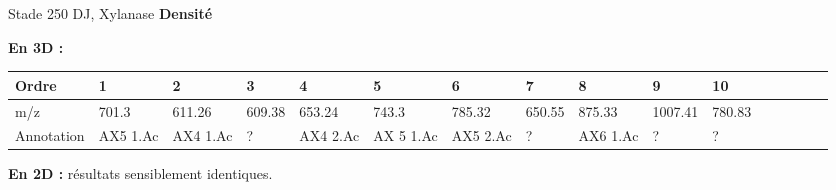 \documentclass[10pt]{beamer}
\begin{document}
\begin{frame}{Stade 250 DJ, Xylanase}
  \textbf{Densité}
  
  \textbf{En 3D :}
    \vspace{-0.4cm}

    \begin{table}[]
    \centering
    \begin{adjustbox}{max width=1\textwidth}
      \begin{tabular}{llllllllllllllll}
        \toprule
        Ordre & 1       & 2       & 3       & 4       & 5       & 6       & 7       & 8       & 9       & 10       \\
        \midrule
        m/z & 701.3 & 611.26 & 609.38 & 653.24 & 743.3 & 785.32 & 650.55 & 875.33 & 1007.41 & 780.83 \\
        Annotation & AX5 1.Ac & AX4 1.Ac & ? & AX4 2.Ac & AX 5 1.Ac & AX5 2.Ac & ? & AX6 1.Ac & ? & ? \\
        \bottomrule
      \end{tabular}
    \end{adjustbox}
  \end{table}

  \textbf{En 2D :} résultats sensiblement identiques.


\end{frame}
\end{document}
